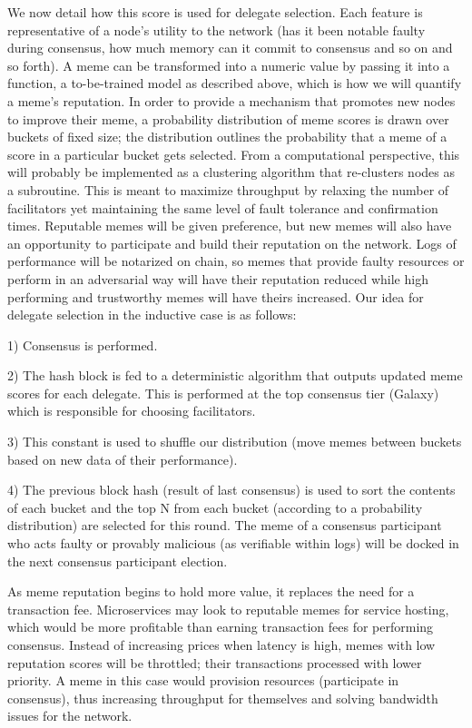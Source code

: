 \documentclass{article}
\begin{document}
We now detail how this score is used for delegate selection. Each feature is representative of a node's utility to the network (has it been notable faulty during consensus, how much memory can it commit to consensus and so on and so forth). A meme can be transformed into a numeric value by passing it into a function, a to-be-trained model as described above, which is how we will quantify a meme's reputation. In order to provide a mechanism that promotes new nodes to improve their meme, a probability distribution of meme scores is drawn over buckets of fixed size; the distribution outlines the probability that a meme of a score in a particular bucket gets selected. From a computational perspective, this will probably be implemented as a clustering algorithm that re-clusters nodes as a subroutine. This is meant to maximize throughput by relaxing the number of facilitators yet maintaining the same level of fault tolerance and confirmation times. Reputable memes will be given preference, but new memes will also have an opportunity to participate and build their reputation on the network. Logs of performance will be notarized on chain, so memes that provide faulty resources or perform in an adversarial way will have their reputation reduced while high performing and trustworthy memes will have theirs increased. Our idea for delegate selection in the inductive case is as follows:

1)	Consensus is performed.

2)	The hash block is fed to a deterministic algorithm that outputs updated meme scores for each delegate. This is performed at the top consensus tier (Galaxy) which is responsible for choosing facilitators.

3)	This constant is used to shuffle our distribution (move memes between buckets based on new data of their performance).

4)	The previous block hash (result of last consensus) is used to sort the contents of each bucket and the top N from each bucket (according to a probability distribution) are selected for this round. The meme of a consensus participant who acts faulty or provably malicious (as verifiable within logs) will be docked in the next consensus participant election.

As meme reputation begins to hold more value, it replaces the need for a transaction fee. Microservices may look to reputable memes for service hosting, which would be more profitable than earning transaction fees for performing consensus. Instead of increasing prices when latency is high, memes with low reputation scores will be throttled; their transactions processed with lower priority. A meme in this case would provision resources (participate in consensus), thus increasing throughput for themselves and solving bandwidth issues for the network.
\end{document}
